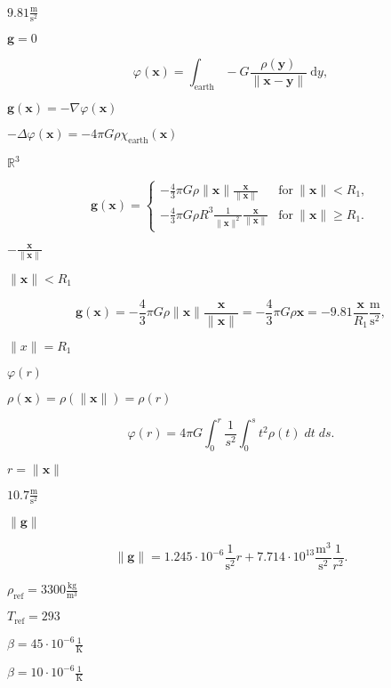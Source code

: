 \documentclass{article}
\begin{document}
$9.81 \frac{\text{m}}{\text{s}^2}$
\pagebreak

$\mathbf g=0$
\pagebreak

\[ \varphi(\mathbf x) = \int_{\text{earth}} -G \frac{\rho(\mathbf y)}{\|\mathbf x-\mathbf y\|} \ \text{d}y, \]
\pagebreak

$\mathbf g(\mathbf x) = -\nabla \varphi(\mathbf x)$
\pagebreak

$-\Delta\varphi(\mathbf x) = -4\pi G \rho \chi_{\text{earth}}(\mathbf x)$
\pagebreak

${\mathbb R}^3$
\pagebreak

\[ \mathbf g(\mathbf x) = \left\{ \begin{array}{ll} -\frac{4}{3}\pi G \rho \|\mathbf x\| \frac{\mathbf x}{\|\mathbf x\|} & \text{for} \ \|\mathbf x\|<R_1, \\ -\frac{4}{3}\pi G \rho R^3 \frac{1}{\|\mathbf x\|^2} \frac{\mathbf x}{\|\mathbf x\|} & \text{for} \ \|\mathbf x\|\ge R_1. \end{array} \right. \]
\pagebreak

$-\frac{\mathbf x}{\|\mathbf x\|}$
\pagebreak

$\|\mathbf x\|<R_1$
\pagebreak

\[ \mathbf g(\mathbf x) = -\frac{4}{3}\pi G \rho \|\mathbf x\| \frac{\mathbf x}{\|\mathbf x\|} = -\frac{4}{3}\pi G \rho \mathbf x = - 9.81 \frac{\mathbf x}{R_1} \frac{\text{m}}{\text{s}^2}, \]
\pagebreak

$\|x\|=R_1$
\pagebreak

$\varphi(r)$
\pagebreak

$\rho(\mathbf x)=\rho(\|\mathbf x\|)=\rho(r)$
\pagebreak

\[ \varphi(r) = 4\pi G \int_0^r \frac 1{s^2} \int_0^s t^2 \rho(t) \; dt \; ds. \]
\pagebreak

$r=\|\mathbf x\|$
\pagebreak

$10.7 \frac{\text{m}}{\text{s}^2}$
\pagebreak

$\|\mathbf{g}\|$
\pagebreak

\[ \|\mathbf{g}\| = 1.245\cdot 10^{-6} \frac{1}{\textrm{s}^2} r + 7.714\cdot 10^{13} \frac{\textrm{m}^3}{\textrm{s}^2}\frac{1}{r^2}. \]
\pagebreak

$\rho_{\text{ref}}=3300 \frac{\text{kg}}{\text{m}^3}$
\pagebreak

$T_{\text{ref}}=293$
\pagebreak

$\beta=45\cdot 10^{-6} \frac 1{\text{K}}$
\pagebreak

$\beta=10\cdot 10^{-6} \frac 1{\text{K}}$
\pagebreak
\end{document}
